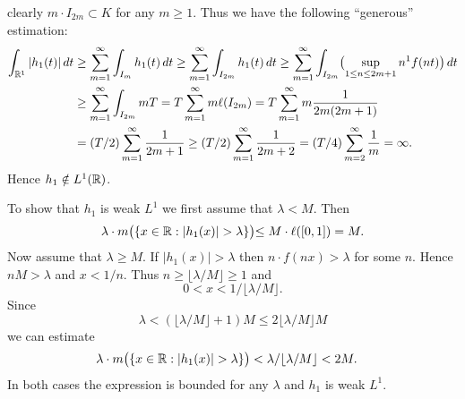 \begin{enumerate}
\begin{itemize}
clearly \(m\cdot I_{2m} \subset K\) for 
any \(m\geq 1\). Thus we have the following  ``generous'' estimation:
\begin{align*}
\int_{\mathbb{R}^1} |h_1(t)|\,dt
&\geq \sum_{m=1}^\infty \int_{I_m} h_1(t)\,dt 
 \geq \sum_{m=1}^\infty \int_{I_{2m}} h_1(t)\,dt 
 \geq \sum_{m=1}^\infty \int_{I_{2m}} 
      \bigl(\sup_{1\leq n\leq 2m+1} n^1 f(nt)\bigr)\,dt \\
&\geq \sum_{m=1}^\infty \int_{I_{2m}} m T 
 =    T \sum_{m=1}^\infty m \ell(I_{2m})  
 =    T \sum_{m=1}^\infty m \frac{1}{2m(2m+1)} \\
&=    (T/2) \sum_{m=1}^\infty  \frac{1}{2m+1}
 \geq (T/2) \sum_{m=1}^\infty  \frac{1}{2m+2}
 =    (T/4) \sum_{m=2}^\infty  \frac{1}{m} = \infty.
\end{align*}
Hence \(h_1 \notin L^1(\mathbb{R})\).

To show that \(h_1\) is weak \(L^1\) we first assume that \(\lambda < M\).
Then
\begin{equation*}
\lambda \cdot m\bigl( \{x\in\mathbb{R}: |h_1(x)| > \lambda\}\bigl)
\leq M \cdot \ell([0,1]) = M.
\end{equation*}
Now assume that \(\lambda \geq M\). If \(|h_1(x)|> \lambda\)
then \(n\cdot f(nx) > \lambda\) for some $n$. 
Hence \(nM > \lambda\) and  \(x < 1/n\).
Thus \(n \geq \lfloor \lambda/M \rfloor \geq 1\) and 
\begin{equation*}
0 < x < 1/\lfloor \lambda/M \rfloor.
\end{equation*}
Since
\begin{equation*}
\lambda < \left(\lfloor \lambda/M\rfloor + 1\right)M 
        \leq 2 \lfloor \lambda/M\rfloor M 
\end{equation*}
we can estimate
\begin{align*}
\lambda \cdot m\bigl( \{x\in\mathbb{R}: |h_1(x)| > \lambda\}\bigl) 
&<  \lambda /\lfloor \lambda/M \rfloor < 2M.
\end{align*}
In both cases the expression is bounded for any \(\lambda\) and 
\(h_1\) is weak \(L^1\).


\end{itemize}
\end{enumerate}
